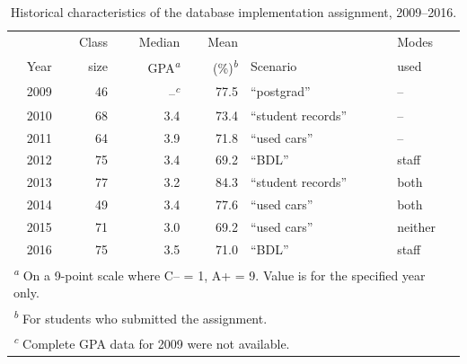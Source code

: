 \documentclass[sigconf, review, anonymous, capitalise]{acmart}
\begin{document}
\begin{table}
    \caption{Historical characteristics of the database implementation assignment, 2009--2016.}
    \label{tab-data}
    \begin{tabular}{rrrrll}
        \toprule
                &   Class   &   Median                          &   Mean                            &               &   Modes   \\
        Year    &   size    &   GPA\textsuperscript{\emph{a}}   &   (\%)\textsuperscript{\emph{b}}  &   Scenario    &   used    \\
        \midrule
        2009    &   46  &   --\textsuperscript{\emph{c}} &   77.5    &   ``postgrad''        &   --  \\
        2010    &   68  &   3.4 &   73.4    &   ``student records'' &   --  \\
        2011    &   64  &   3.9 &   71.8    &   ``used cars''       &   --  \\
        \midrule
        2012    &   75  &   3.4 &   69.2    &   ``BDL''             &   staff   \\
        2013    &   77  &   3.2 &   84.3    &   ``student records'' &   both \\
        \midrule
        2014    &   49  &   3.4 &   77.6    &   ``used cars''       &   both \\
        2015    &   71  &   3.0 &   69.2    &   ``used cars''       &   neither  \\
        2016    &   75  &   3.5 &   71.0    &   ``BDL''             &   staff   \\
        \bottomrule
        \multicolumn{6}{l}{\footnotesize \textsuperscript{\emph{a}} On a 9-point scale where C-- = 1, A+ = 9. Value is for the specified year only.}    \\
        \multicolumn{6}{l}{\footnotesize \textsuperscript{\emph{b}} For students who submitted the assignment.}    \\
        \multicolumn{6}{l}{\footnotesize \textsuperscript{\emph{c}} Complete GPA data for 2009 were not available.}    \\
    \end{tabular}
\end{table}
\end{document}
